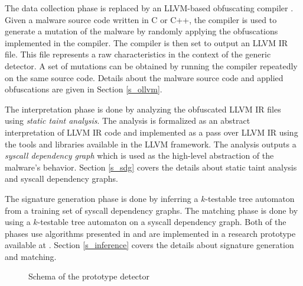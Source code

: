 The data collection phase is replaced by an \textsc{LLVM}-based obfuscating compiler \cite{ollvm}. Given a malware source code written in C or C++, the compiler is used to generate a mutation of the malware by randomly applying the obfuscations implemented in the compiler. The compiler is then set to output an \textsc{LLVM IR} file. This file represents a raw characteristics in the context of the generic detector. A set of mutations can be obtained by running the compiler repeatedly on the same source code. Details about the malware source code and applied obfuscations are given in Section \ref{s_ollvm}.

The interpretation phase is done by analyzing the obfuscated \textsc{LLVM IR} files using \emph{static taint analysis}. The analysis is formalized as an abstract interpretation of \textsc{LLVM IR} code and implemented as a pass over \textsc{LLVM IR} using the tools and libraries available in the \textsc{LLVM} framework. The analysis outputs a \emph{syscall dependency graph} which is used as the high-level abstraction of the malware's behavior. Section \ref{s_sdg} covers the details about static taint analysis and syscall dependency graphs.

The signature generation phase is done by inferring a $k$-testable tree automaton from a training set of syscall dependency graphs. The matching phase is done by using a $k$-testable tree automaton on a syscall dependency graph. Both of the phases use algorithms presented in \cite{Babic11} and are implemented in a research prototype available at \cite{BabicWWW}. Section \ref{s_inference} covers the details about signature generation and matching.

\begin{figure}[H]
    \centering
    \caption{Schema of the prototype detector}
    \label{fig_detector}
\end{figure}

